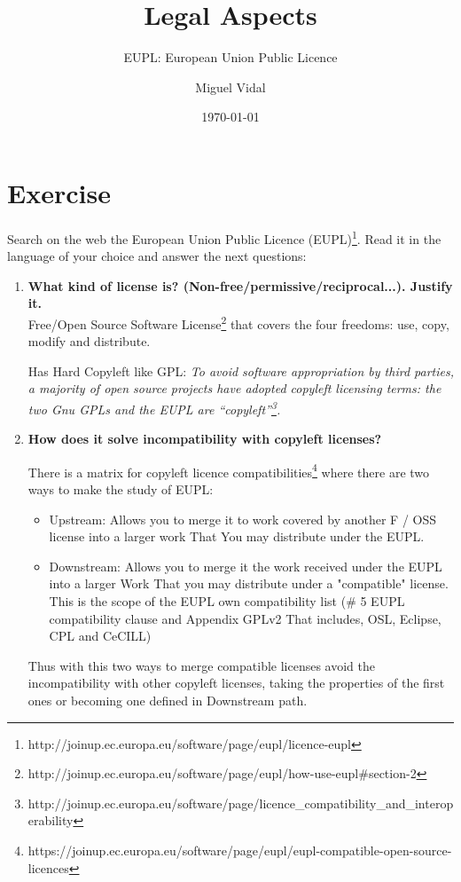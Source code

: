 \documentclass[11pt]{scrartcl}
\title{\textbf{Legal Aspects}}
\subtitle{EUPL: European Union Public Licence}
\author{Miguel Vidal}
\date{\today}
\begin{document}
\maketitle

\section{Exercise}

Search on the web the European Union Public Licence (EUPL)\footnote{http://joinup.ec.europa.eu/software/page/eupl/licence-eupl}. Read it in the language of your choice and answer the next questions:
\begin{enumerate}

	\item \textbf{What kind of license is? (Non-free/permissive/reciprocal...). Justify it.}\\
	
	Free/Open Source Software License\footnote{http://joinup.ec.europa.eu/software/page/eupl/how-use-eupl\#section-2} that covers the four freedoms: use, copy, modify and distribute.
	
	Has Hard Copyleft like GPL: \emph{To avoid software appropriation by third parties, a majority of open source projects have adopted copyleft licensing terms: the two Gnu GPLs and the EUPL are “copyleft”\footnote{http://joinup.ec.europa.eu/software/page/licence\_compatibility\_and\_interoperability}.}
	\item \textbf{How does it solve incompatibility with copyleft licenses?}
	
	There is a matrix for copyleft licence compatibilities\footnote{https://joinup.ec.europa.eu/software/page/eupl/eupl-compatible-open-source-licences} where there are two ways to make the study of EUPL:

	\begin{itemize}
		\item Upstream: Allows you to merge it to work covered by another F / OSS license into a larger work That You may distribute under the EUPL.

		\item Downstream: Allows you to merge it the work received under the EUPL into a larger Work That you may distribute under a "compatible" license. This is the scope of the EUPL own compatibility list (\# 5 EUPL compatibility clause and Appendix GPLv2 That includes, OSL, Eclipse, CPL and CeCILL)
	\end{itemize}
	
	Thus with this two ways to merge compatible licenses avoid the incompatibility with other copyleft licenses, taking the properties of the first ones or becoming one defined in Downstream path.
	

\end{enumerate}
\end{document}
